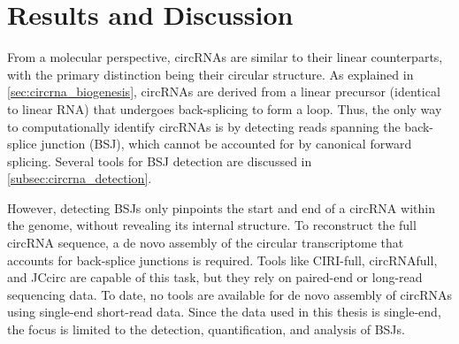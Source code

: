 \chapter{Results and Discussion}

From a molecular perspective, circRNAs are similar to their linear
counterparts, with the primary distinction being their circular structure.
As explained in \cref{sec:circrna_biogenesis}, circRNAs are derived from a
linear precursor (identical to linear RNA) that undergoes back-splicing to form
a loop.
Thus, the only way to computationally identify circRNAs is by detecting reads
spanning the back-splice junction (BSJ), which cannot be accounted for by
canonical forward splicing.
Several tools for BSJ detection are discussed in
\cref{subsec:circrna_detection}.

However, detecting BSJs only pinpoints the start and end of a circRNA within
the genome, without revealing its internal structure.
To reconstruct the full circRNA sequence, a de novo assembly of the circular
transcriptome that accounts for back-splice junctions is required.
Tools like CIRI-full, circRNAfull, and JCcirc are capable of this task, but
they rely on paired-end or long-read sequencing data.
To date, no tools are available for de novo assembly of circRNAs using
single-end short-read data.
Since the data used in this thesis is single-end, the focus is limited to the
detection, quantification, and analysis of BSJs.





